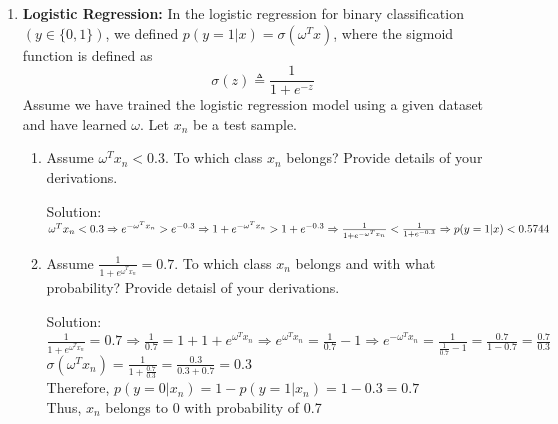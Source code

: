 \documentclass[12pt]{article}
\newcommand{\solu}{{\color{blue} Solution:}}
\begin{document}
\begin{enumerate}
        \item \textbf{Logistic Regression:} In the logistic regression for binary classification $(y \in \{0,1\})$, we defined $p(y = 1 | x) = \sigma(\omega^Tx)$, where the sigmoid function is defined as
        $$\sigma(z) \triangleq \frac{1}{1 + e^{-z}}$$
        Assume we have trained the logistic regression model using a given dataset and have learned $\omega$. Let $x_n$ be a test sample.
        \begin{enumerate}
            \item Assume $\omega^T x_n < 0.3$. To which class $x_n$ belongs? Provide details of your derivations.
            
            \solu\\
            $\omega^T x_n < 0.3 \Rightarrow e^{-\omega^T x_n} > e^{-0.3}\\
            \Rightarrow 1 + e^{-\omega^T x_n} > 1 + e^{-0.3}\\
            \Rightarrow \frac{1}{1 + e^{-\omega^T x_n}} < \frac{1}{1 + e^{-0.3}}\\
            \Rightarrow p(y = 1 | x) < 0.5744$

            \item Assume $\frac{1}{1+e^{\omega^T x_n}} = 0.7.$ To which class $x_n$ belongs and with what probability? Provide detaisl of your derivations.
            
            \solu \\
            $\frac{1}{1+e^{\omega^T x_n}} = 0.7 \Rightarrow \frac{1}{0.7} = 1 + 1+e^{\omega^T x_n} \Rightarrow e^{\omega^T x_n} = \frac{1}{0.7} -1 \Rightarrow e^{-\omega^T x_n} = \frac{1}{\frac{1}{0.7} -1} = \frac{0.7}{1-0.7} = \frac{0.7}{0.3} $\\
            $\sigma(\omega^Tx_n) = \frac{1}{1+\frac{0.7}{0.3}} = \frac{0.3}{0.3+0.7} = 0.3$\\
            Therefore, $p(y = 0 | x_n) = 1 - p(y = 1 | x_n) = 1-0.3 = 0.7$ \\
            Thus, $x_n$ belongs to 0 with probability of 0.7
        \end{enumerate}
    \end{enumerate}
\end{document}
